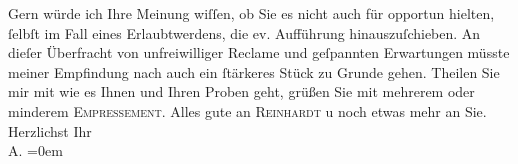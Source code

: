 \begin{ledgroupsized}[t]{13cm}
           \pstart
           Gern würde ich Ihre Meinung wiſſen, ob Sie es nicht auch für opportun hielten, ſelbſt
               im Fall eines Erlaubtwerdens, die \strikeout{\textcolor{gray}{Geſchichte}} ev. Aufführung
               hinauszuſchieben. An dieſer Überfracht von unfreiwilliger Reclame und geſpannten
               Erwartungen müsste meiner {\pb}Empfindung nach auch ein
               ſtärkeres Stück zu Grunde gehen.\pend
           \pstart
           Theilen Sie mir mit wie es Ihnen und Ihren Proben geht, grüßen Sie mit mehrerem oder minderem \textsc{Empressement}.\pend
           \pstart
           Alles gute an \textsc{Reinhardt} u noch etwas mehr an Sie.\pend
           \pstart
           Herzlichst Ihr{\\[\baselineskip]}\spacefill\mbox{A.}\pend
           \leftskip=0em{}
         
         \endnumbering{}\end{ledgroupsized}  \newcommand{\dateiname}{L01472}\newcommand{\titel}{Arthur Schnitzler an Richard Beer-Hofmann, 28. 11. 1904}\newcommand{\editorInnen}{Martin Anton Müller und Gerd-Hermann Susen}
      
